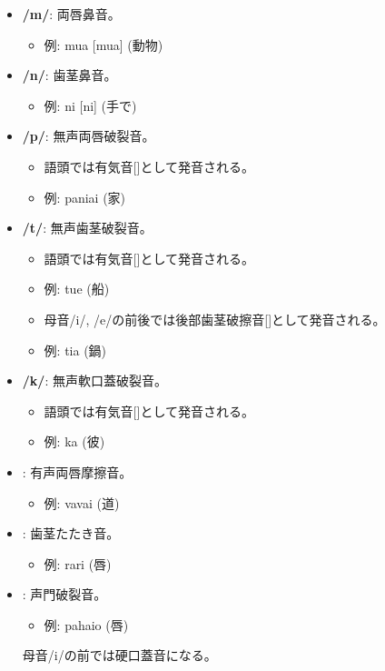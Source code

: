 \begin{itemize}
    \item \textbf{/m/}: 両唇鼻音。
    \begin{itemize}
        \item 例: mua [mua] (動物)
    \end{itemize}

    \item \textbf{/n/}: 歯茎鼻音。
    \begin{itemize}
        \item 例: ni [ni] (手で)
    \end{itemize}

    \item \textbf{/p/}: 無声両唇破裂音。
    \begin{itemize}
        \item 語頭では有気音[]として発音される。
        \item 例:  paniai  (家)
    \end{itemize}

    \item \textbf{/t/}: 無声歯茎破裂音。
    \begin{itemize}
        \item 語頭では有気音[]として発音される。
        \item 例: tue \textipa{[t\super{h}ue]} (船)
        \item 母音/i/, /e/の前後では後部歯茎破擦音[]として発音される。
        \item 例: tia \textipa{[tS\super{h}ia]} (鍋)
    \end{itemize}

    \item \textbf{/k/}: 無声軟口蓋破裂音。
    \begin{itemize}
        \item 語頭では有気音[]として発音される。
        \item 例: ka \textipa{[k\super{h}a]} (彼)
    \end{itemize}

    
    \item \textbf{}: 有声両唇摩擦音。
    \begin{itemize}
        \item 例: vavai \textipa{[BaBai]} (道)
    \end{itemize}
    
    \item \textbf{}: 歯茎たたき音。
    \begin{itemize}
        \item 例: rari \textipa{[RaRi]} (唇)
    \end{itemize}

    \item \textbf{}: 声門破裂音。
    \begin{itemize}
        \item 例: pahaio  (唇)
    \end{itemize}
    母音/i/の前では硬口蓋音\textipa{[C]}になる。
\end{itemize}